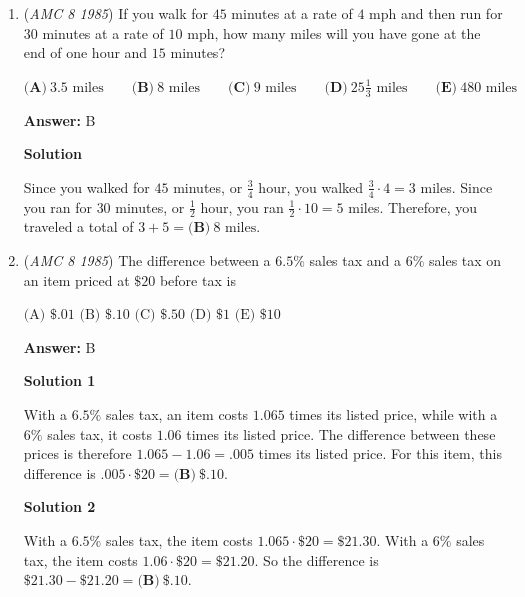 \begin{enumerate}
The perimeter of the triangle is $6.2+8.3+9.5=24\text{ cm}$.  Therefore, the perimeter of the square is also $24 \text{ cm}$, so its side length is $\frac{24}{4}=6 \text{ cm}$ and its area is $6^2= \boxed{\textbf{(B)}\ 36 \text{ cm}^2}$.

 


	\item (\textit{AMC 8 1985}) If you walk for $45$ minutes at a rate of $4 \text{ mph}$ and then run for $30$ minutes at a rate of $10\text{ mph,}$ how many miles will you have gone at the end of one hour and $15$ minutes?


 $\textbf{(A)}\ 3.5\text{ miles} \qquad \textbf{(B)}\ 8\text{ miles} \qquad \textbf{(C)}\ 9\text{ miles} \qquad \textbf{(D)}\ 25\frac{1}{3}\text{ miles} \qquad \textbf{(E)}\ 480\text{ miles}$

 \textbf{Answer: }B



\textbf{Solution}

Since you walked for $45$ minutes, or $\frac{3}{4}$ hour, you walked $\frac{3}{4}\cdot 4 = 3$ miles.  Since you ran for $30$ minutes, or $\frac{1}{2}$ hour, you ran $\frac{1}{2}\cdot 10 = 5$ miles.  Therefore, you traveled a total of $3+5=\boxed{\textbf{(B)}\ 8\text{ miles}}$.

 


	\item (\textit{AMC 8 1985}) The difference between a $6.5\%$ sales tax and a $6\%$ sales tax on an item priced at $\$20$ before tax is


 $\text{(A)}$ $\$.01$
$\text{(B)}$ $\$.10$
$\text{(C)}$ $\$ .50$
$\text{(D)}$ $\$ 1$
$\text{(E)}$ $\$10$

 \textbf{Answer: }B



\textbf{Solution 1}

With a $6.5\%$ sales tax, an item costs $1.065$ times its listed price, while with a $6\%$ sales tax, it costs $1.06$ times its listed price.  The difference between these prices is therefore $1.065 - 1.06 = .005$ times its listed price.  For this item, this difference is $.005 \cdot \$20 = \boxed{\textbf{(B)}\ \$.10}$.

 



\textbf{Solution 2}

With a $6.5\%$ sales tax, the item costs $1.065 \cdot \$20 = \$21.30$.  With a $6\%$ sales tax, the item costs $1.06 \cdot \$20 = \$21.20$.  So the difference is $\$21.30 - \$21.20 = \boxed{\textbf{(B)}\ \$.10}$.


\end{enumerate}
